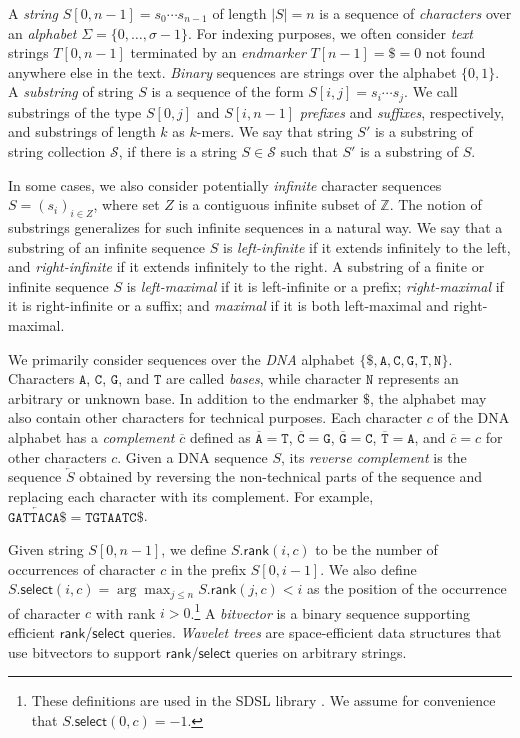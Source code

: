 \documentclass[a4paper,UKenglish]{lipics-v2016}
\newcommand{\set}[1]{\ensuremath{\{ #1 \}}}
\newcommand{\abs}[1]{\ensuremath{\lvert #1 \rvert}}
\newcommand{\dnaseq}[1]{\ensuremath{\mathtt{#1}}}
\newcommand{\baseA}{\dnaseq{A}}
\newcommand{\baseC}{\dnaseq{C}}
\newcommand{\baseG}{\dnaseq{G}}
\newcommand{\baseT}{\dnaseq{T}}
\newcommand{\baseN}{\dnaseq{N}}
\newcommand{\dnacomp}[1]{\ensuremath{\overline{#1}}}
\newcommand{\revcomp}[1]{\ensuremath{\overleftarrow{#1}}}
\newcommand{\rank}{\ensuremath{\mathsf{rank}}}
\newcommand{\select}{\ensuremath{\mathsf{select}}}
\newcommand{\kmer}[1]{$#1$\nobreakdash-mer}
\begin{document}
A \emph{string} $S[0, n-1] = s_{0} \dotsm s_{n-1}$ of length $\abs{S} = n$ is a sequence of \emph{characters} over an \emph{alphabet} $\Sigma = \set{0, \dotsc, \sigma - 1}$. For indexing purposes, we often consider \emph{text} strings $T[0, n-1]$ terminated by an \emph{endmarker} $T[n-1] = \$ = 0$ not found anywhere else in the text. \emph{Binary} sequences are strings over the alphabet $\set{0, 1}$. A \emph{substring} of string $S$ is a sequence of the form $S[i, j] = s_{i} \dotsm s_{j}$. We call substrings of the type $S[0, j]$ and $S[i, n-1]$ \emph{prefixes} and \emph{suffixes}, respectively, and substrings of length $k$ as \kmer{k}s. We say that string $S'$ is a substring of string collection $\mathcal{S}$, if there is a string $S \in \mathcal{S}$ such that $S'$ is a substring of $S$.

In some cases, we also consider potentially \emph{infinite} character sequences $S = (s_{i})_{i \in Z}$, where set $Z$ is a contiguous infinite subset of $\mathbb{Z}$. The notion of substrings generalizes for such infinite sequences in a natural way. We say that a substring of an infinite sequence $S$ is \emph{left-infinite} if it extends infinitely to the left, and \emph{right-infinite} if it extends infinitely to the right. A substring of a finite or infinite sequence $S$ is \emph{left-maximal} if it is left-infinite or a prefix; \emph{right-maximal} if it is right-infinite or a suffix; and \emph{maximal} if it is both left-maximal and right-maximal.

We primarily consider sequences over the \emph{DNA} alphabet $\set{\$, \baseA, \baseC, \baseG, \baseT, \baseN}$. Characters $\baseA$, $\baseC$, $\baseG$, and $\baseT$ are called \emph{bases}, while character $\baseN$ represents an arbitrary or unknown base. In addition to the endmarker $\$$, the alphabet may also contain other characters for technical purposes. Each character $c$ of the DNA alphabet has a \emph{complement} $\dnacomp{c}$ defined as $\dnacomp{\baseA} = \baseT$, $\dnacomp{\baseC} = \baseG$, $\dnacomp{\baseG} = \baseC$, $\dnacomp{\baseT} = \baseA$, and $\dnacomp{c} = c$ for other characters $c$. Given a DNA sequence $S$, its \emph{reverse complement} is the sequence $\revcomp{S}$ obtained by reversing the non-technical parts of the sequence and replacing each character with its complement. For example, $\revcomp{\dnaseq{GATTACA}\$} = \dnaseq{TGTAATC}\$$.

Given string $S[0, n-1]$, we define $S.\rank(i, c)$ to be the number of occurrences of character $c$ in the prefix $S[0, i-1]$. We also define $S.\select(i, c) = \arg \max_{j \le n} S.\rank(j, c) < i$ as the position of the occurrence of character $c$ with rank $i > 0$.\footnote{These definitions are used in the SDSL library \cite{Gog2014b}. We assume for convenience that $S.\select(0, c) = -1$.} A \emph{bitvector} is a binary sequence supporting efficient $\rank$/$\select$ queries. \emph{Wavelet trees} \cite{Grossi2003} are space-efficient data structures that use bitvectors to support $\rank$/$\select$ queries on arbitrary strings.
\end{document}
